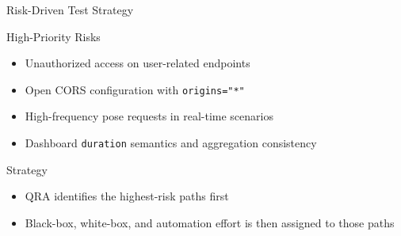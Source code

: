 \begin{frame}{Risk-Driven Test Strategy}
    \small
    \begin{block}{High-Priority Risks}
        \begin{itemize}
            \item Unauthorized access on user-related endpoints
            \item Open CORS configuration with \texttt{origins="*"}
            \item High-frequency pose requests in real-time scenarios
            \item Dashboard \texttt{duration} semantics and aggregation consistency
        \end{itemize}
    \end{block}

    \begin{block}{Strategy}
        \begin{itemize}
            \item QRA identifies the highest-risk paths first
            \item Black-box, white-box, and automation effort is then assigned to those paths
        \end{itemize}
    \end{block}
\end{frame}

